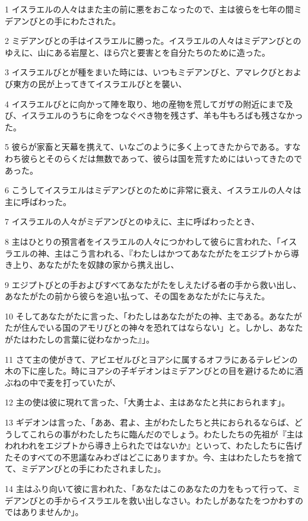 \par 1 イスラエルの人々はまた主の前に悪をおこなったので、主は彼らを七年の間ミデアンびとの手にわたされた。
\par 2 ミデアンびとの手はイスラエルに勝った。イスラエルの人々はミデアンびとのゆえに、山にある岩屋と、ほら穴と要害とを自分たちのために造った。
\par 3 イスラエルびとが種をまいた時には、いつもミデアンびと、アマレクびとおよび東方の民が上ってきてイスラエルびとを襲い、
\par 4 イスラエルびとに向かって陣を取り、地の産物を荒してガザの附近にまで及び、イスラエルのうちに命をつなぐべき物を残さず、羊も牛もろばも残さなかった。
\par 5 彼らが家畜と天幕を携えて、いなごのように多く上ってきたからである。すなわち彼らとそのらくだは無数であって、彼らは国を荒すためにはいってきたのであった。
\par 6 こうしてイスラエルはミデアンびとのために非常に衰え、イスラエルの人々は主に呼ばわった。
\par 7 イスラエルの人々がミデアンびとのゆえに、主に呼ばわったとき、
\par 8 主はひとりの預言者をイスラエルの人々につかわして彼らに言われた、「イスラエルの神、主はこう言われる、『わたしはかつてあなたがたをエジプトから導き上り、あなたがたを奴隷の家から携え出し、
\par 9 エジプトびとの手およびすべてあなたがたをしえたげる者の手から救い出し、あなたがたの前から彼らを追い払って、その国をあなたがたに与えた。
\par 10 そしてあなたがたに言った、「わたしはあなたがたの神、主である。あなたがたが住んでいる国のアモリびとの神々を恐れてはならない」と。しかし、あなたがたはわたしの言葉に従わなかった』」。
\par 11 さて主の使がきて、アビエゼルびとヨアシに属するオフラにあるテレビンの木の下に座した。時にヨアシの子ギデオンはミデアンびとの目を避けるために酒ぶねの中で麦を打っていたが、
\par 12 主の使は彼に現れて言った、「大勇士よ、主はあなたと共におられます」。
\par 13 ギデオンは言った、「ああ、君よ、主がわたしたちと共におられるならば、どうしてこれらの事がわたしたちに臨んだのでしょう。わたしたちの先祖が『主はわれわれをエジプトから導き上られたではないか』といって、わたしたちに告げたそのすべての不思議なみわざはどこにありますか。今、主はわたしたちを捨てて、ミデアンびとの手にわたされました」。
\par 14 主はふり向いて彼に言われた、「あなたはこのあなたの力をもって行って、ミデアンびとの手からイスラエルを救い出しなさい。わたしがあなたをつかわすのではありませんか」。
